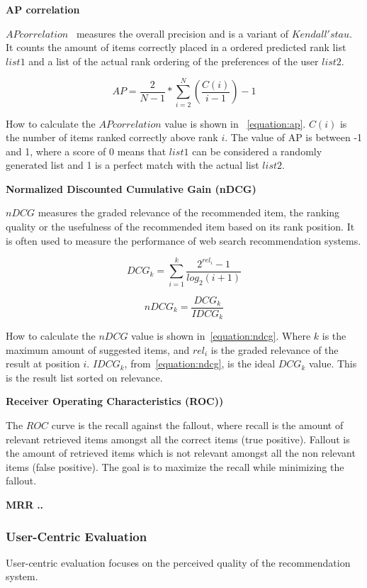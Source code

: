 \textbf{AP correlation}

$AP correlation$~\cite{Yilmaz:2008:NRC:1390334.1390435} measures the overall precision and is a variant of $Kendall's tau$.
It counts the amount of items correctly placed in a ordered predicted rank list $list1$ and a list of the actual rank ordering of the preferences of the user $list2$.

\begin{equation}
	AP = \frac{2}{N - 1} * \sum_{i=2}^{N}{(\frac{C(i)}{i - 1})} - 1
	\label{equation:ap}
\end{equation}

How to calculate the $AP correlation$ value is shown in ~\ref{equation:ap}.
$C(i)$ is the number of items ranked correctly above rank $i$.
The value of AP is between -1 and 1, where a score of 0 means that $list1$ can be considered a randomly generated list and 1 is a perfect match with the actual list $list2$.


\textbf{Normalized Discounted Cumulative Gain (nDCG)}

$nDCG$ measures the graded relevance of the recommended item, the ranking quality or the usefulness of the recommended item based on its rank position.
It is often used to measure the performance of web search recommendation systems.

\begin{equation}
	DCG_k = \sum_{i=1}^{k}{\frac{2^{rel_i}-1}{log_2(i+1)}}
	\label{equation:dcg}
\end{equation}

\begin{equation}
	nDCG_k = \frac{DCG_k}{IDCG_k}
	\label{equation:ndcg}
\end{equation}

How to calculate the $nDCG$ value is shown in~\ref{equation:ndcg}.
Where $k$ is the maximum amount of suggested items, and $rel_i$ is the graded relevance of the result at position $i$.
$IDCG_k$, from~\ref{equation:ndcg}, is the ideal $DCG_k$ value.
This is the result list sorted on relevance.



\textbf{Receiver Operating Characteristics (ROC))}

The $ROC$ curve is the recall against the fallout, where recall is the amount of relevant retrieved items amongst all the correct items (true positive).
Fallout is the amount of retrieved items which is not relevant amongst all the non relevant items (false positive).
The goal is to maximize the recall while minimizing the fallout.


\textbf{MRR}
\textbf{..}


\subsubsection{User-Centric Evaluation}
User-centric evaluation focuses on the perceived quality of the recommendation system.

\cite{Pu:2011:UEF:2043932.2043962}
\cite{Knijnenburg:2011:PPS:2043932.2043993}
